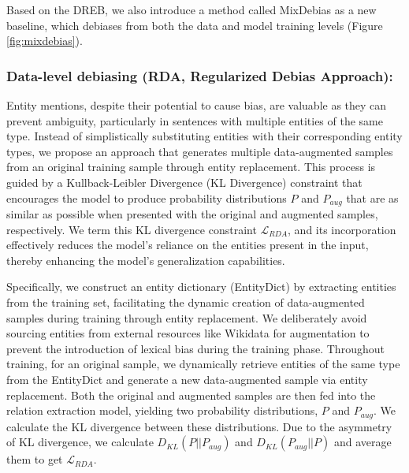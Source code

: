 \documentclass[letterpaper]{article} %
\begin{document}
Based on the DREB, we also introduce a method called MixDebias as a new baseline, which debiases from both the data and model training levels (Figure \ref{fig:mixdebias}).

\subsubsection{Data-level debiasing (RDA, Regularized Debias Approach):} 
Entity mentions, despite their potential to cause bias, are valuable as they can prevent ambiguity, particularly in sentences with multiple entities of the same type. Instead of simplistically substituting entities with their corresponding entity types, we propose an approach that generates multiple data-augmented samples from an original training sample through entity replacement. This process is guided by a Kullback-Leibler Divergence (KL Divergence) constraint that encourages the model to produce probability distributions \( P \) and \( P_{aug} \) that are as similar as possible when presented with the original and augmented samples, respectively. We term this KL divergence constraint \( \mathcal{L}_{RDA} \), and its incorporation effectively reduces the model's reliance on the entities present in the input, thereby enhancing the model's generalization capabilities.

Specifically, we construct an entity dictionary (EntityDict) by extracting entities from the training set, facilitating the dynamic creation of data-augmented samples during training through entity replacement. We deliberately avoid sourcing entities from external resources like Wikidata for augmentation to prevent the introduction of lexical bias during the training phase. Throughout training, for an original sample, we dynamically retrieve entities of the same type from the EntityDict and generate a new data-augmented sample via entity replacement. Both the original and augmented samples are then fed into the relation extraction model, yielding two probability distributions, \( P \) and \( P_{aug} \). We calculate the KL divergence between these distributions. Due to the asymmetry of KL divergence, we calculate \(D_{KL}(P || P_{aug})\) and \(D_{KL}(P_{aug} || P)\) and average them to get \(\mathcal{L}_{RDA}\).
\end{document}
